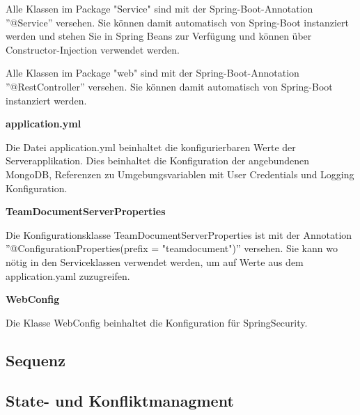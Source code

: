 Alle Klassen im Package "Service" sind mit der Spring-Boot-Annotation ''@Service'' versehen.
Sie können damit automatisch von Spring-Boot instanziert werden und stehen Sie in Spring Beans zur Verfügung und können über Constructor-Injection verwendet werden.

Alle Klassen im Package "web" sind mit der Spring-Boot-Annotation ''@RestController'' versehen.
Sie können damit automatisch von Spring-Boot instanziert werden.

\textbf{application.yml}

Die Datei application.yml beinhaltet die konfigurierbaren Werte der Serverapplikation.
Dies beinhaltet die Konfiguration der angebundenen MongoDB, Referenzen zu Umgebungsvariablen mit User Credentials und Logging Konfiguration.

\textbf{TeamDocumentServerProperties}

Die Konfigurationsklasse TeamDocumentServerProperties ist mit der Annotation ''@ConfigurationProperties(prefix = "teamdocument")'' versehen.
Sie kann wo nötig in den Serviceklassen verwendet werden, um auf Werte aus dem application.yaml zuzugreifen.

\textbf{WebConfig}

Die Klasse WebConfig beinhaltet die Konfiguration für SpringSecurity.

\clearpage

\subsection{Sequenz}

\clearpage

\subsection{State- und Konfliktmanagment}

\clearpage
